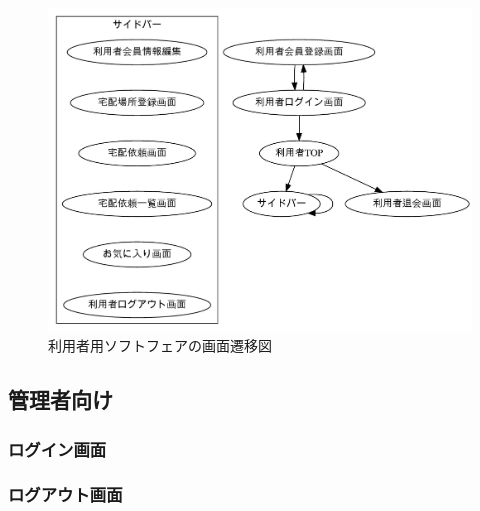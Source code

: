 \documentclass[a4paper, titlepage]{jsarticle}
\begin{document}
\begin{figure}[H]
  \centering
  \includegraphics[width=\linewidth]{other/user.pdf}
  \caption{利用者用ソフトフェアの画面遷移図}
  \label{fig:user_diagram}
\end{figure}

\subsection{管理者向け}
\subsubsection{ログイン画面}
\subsubsection{ログアウト画面}
\end{document}
